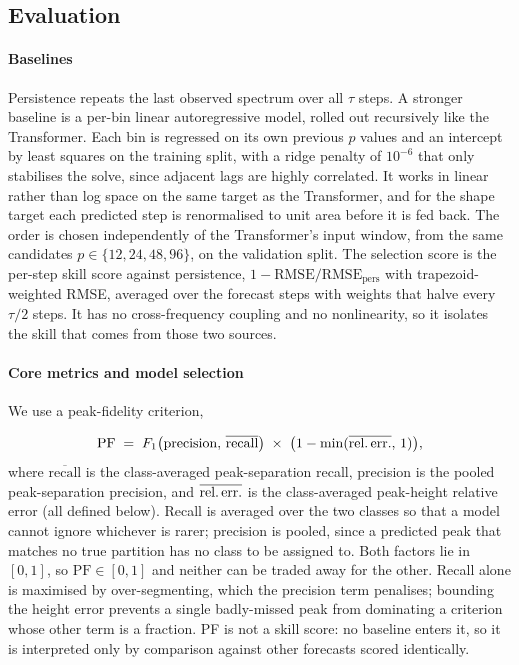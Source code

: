 \subsection{Evaluation}
\label{sec:evaluation}
 
\paragraph{Baselines}
Persistence repeats the last observed spectrum over all $\tau$ steps. A stronger baseline is a per-bin linear autoregressive model, rolled out recursively like the Transformer. Each bin is regressed on its own previous $p$ values and an intercept by least squares on the training split, with a ridge penalty of $10^{-6}$ that only stabilises the solve, since adjacent lags are highly correlated. It works in linear rather than log space on the same target as the Transformer, and for the shape target each predicted step is renormalised to unit area before it is fed back. The order is chosen independently of the Transformer's input window, from the same candidates $p \in \{12, 24, 48, 96\}$, on the validation split. The selection score is the per-step skill score against persistence, $1 - \mathrm{RMSE}/\mathrm{RMSE}_{\text{pers}}$ with trapezoid-weighted RMSE, averaged over the forecast steps with weights that halve every $\tau/2$ steps. It has no cross-frequency coupling and no nonlinearity, so it isolates the skill that comes from those two sources.

\paragraph{Core metrics and model selection}
We use a peak-fidelity criterion,

\begin{equation}
\text{PF} \;=\; F_1\!\left(\text{precision},\, \overline{\text{recall}}\right) \;\times\; \bigl(1 - \min(\overline{\text{rel.\,err.}},\, 1)\bigr),
\end{equation}
where $\overline{\text{recall}}$ is the class-averaged peak-separation recall, precision is the pooled peak-separation precision, and $\overline{\text{rel.\,err.}}$ is the class-averaged peak-height relative error (all defined below). Recall is averaged over the two classes so that a model cannot ignore whichever is rarer; precision is pooled, since a predicted peak that matches no true partition has no class to be assigned to. Both factors lie in $[0,1]$, so $\text{PF} \in [0,1]$ and neither can be traded away for the other. Recall alone is maximised by over-segmenting, which the precision term penalises; bounding the height error prevents a single badly-missed peak from dominating a criterion whose other term is a fraction. PF is not a skill score: no baseline enters it, so it is interpreted only by comparison against other forecasts scored identically.

